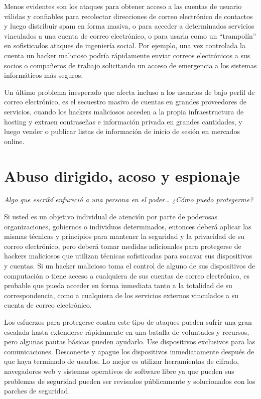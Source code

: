 \documentclass[10pt,a5paper,twoside,,]{book}
\begin{document}
Menos evidentes son los ataques para obtener acceso a las cuentas de
usuario válidas y confiables para recolectar direcciones de correo
electrónico de contactos y luego distribuir spam en forma masiva, o para
acceder a determinados servicios vinculados a una cuenta de correo
electrónico, o para usarla como un ``trampolín'' en sofisticados ataques
de ingeniería social. Por ejemplo, una vez controlada la cuenta un
hacker malicioso podría rápidamente enviar correos electrónicos a sus
socios o compañeros de trabajo solicitando un acceso de emergencia a los
sistemas informáticos más seguros.

Un último problema inesperado que afecta incluso a los usuarios de bajo
perfil de correo electrónico, es el secuestro masivo de cuentas en
grandes proveedores de servicios, cuando los hackers maliciosos acceden
a la propia infraestructura de hosting y extraen contraseñas e
información privada en grandes cantidades, y luego vender o publicar
listas de información de inicio de sesión en mercados online.

\section{Abuso dirigido, acoso y
espionaje}\label{abuso-dirigido-acoso-y-espionaje}

\emph{Algo que escribí enfureció a una persona en el poder\ldots{} ¿Cómo
puedo protegerme?}

Si usted es un objetivo individual de atención por parte de poderosas
organizaciones, gobiernos o individuos determinados, entonces deberá
aplicar las mismas técnicas y principios para mantener la seguridad y la
privacidad de su correo electrónico, pero deberá tomar medidas
adicionales para protegerse de hackers maliciosos que utilizan técnicas
sofisticadas para socavar sus dispositivos y cuentas. Si un hacker
malicioso toma el control de alguno de sus dispositivos de computación o
tiene acceso a cualquiera de sus cuentas de correo electrónico, es
probable que pueda acceder en forma inmediata tanto a la totalidad de su
correspondencia, como a cualquiera de los servicios externos vinculados
a su cuenta de correo electrónico.

Los esfuerzos para protegerse contra este tipo de ataques pueden sufrir
una gran escalada hasta extenderse rápidamente en una batalla de
voluntades y recursos, pero algunas pautas básicas pueden ayudarlo. Use
dispositivos exclusivos para las comunicaciones. Desconecte y apague los
dispositivos inmediatamente después de que haya terminado de usarlos. Lo
mejor es utilizar herramientas de cifrado, navegadores web y sistemas
operativos de software libre ya que pueden sus problemas de seguridad
pueden ser revisados públicamente y solucionados con los parches de
seguridad.
\end{document}
